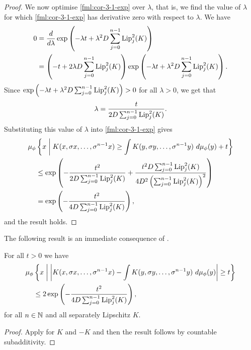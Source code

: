 \begin{corollary}
\begin{proof}
		We now optimise \eqref{fml:cor-3-1-exp} over $\lambda$, that is, we find the value of $\lambda$ for which \eqref{fml:cor-3-1-exp} has derivative zero with respect to $\lambda$. We have
		\begin{align*}
			0 &= \frac{d}{d\lambda} \exp\left(-\lambda t + \lambda^2 D \sum_{j = 0}^{n - 1}{\operatorname{Lip}_j^2(K)}\right) \\
				&= \left(-t + 2\lambda D \sum_{j = 0}^{n - 1}{\operatorname{Lip}_j^2(K)}\right) \exp\left(-\lambda t + \lambda^2 D \sum_{j = 0}^{n - 1}{\operatorname{Lip}_j^2(K)}\right).
		\end{align*}
		Since $\exp\left(-\lambda t + \lambda^2 D \sum_{j = 0}^{n - 1}{\operatorname{Lip}_j^2(K)}\right) > 0$ for all $\lambda > 0$, we get that
		\[
			\lambda = \frac{t}{2D \sum_{j = 0}^{n - 1}{\operatorname{Lip}_j^2(K)}}.
		\]
		Substituting this value of $\lambda$ into \eqref{fml:cor-3-1-exp} gives
		\begin{align*}
			\mu_\phi&\left\{x \midmid K(x, \sigma{x}, \dots, \sigma^{n - 1}{x}) \geq \int{K(y, \sigma{y}, \dots, \sigma^{n - 1}{y})\ d\mu_\phi(y)} + t\right\} \\
			 &\leq \exp\left(-\frac{t^2}{2D \sum_{j = 0}^{n - 1}{\Lip_j^2(K)}} + \frac{t^2 D \sum_{j = 0}^{n - 1}{\Lip_j^2(K)}}{4D^2 \left(\sum_{j = 0}^{n - 1}{\Lip_j^2(K)}\right)^2}\right) \\
			 &= \exp\left(-\frac{t^2}{4D\sum_{j = 0}^{n - 1}{\Lip_j^2(K)}}\right),
		\end{align*}
		and the result holds.
	\end{proof}
\end{corollary}

The following result is an immediate consequence of .

\begin{corollary}\label{cor:cm-3-1-5}
	For all $t > 0$ we have
	\begin{align}\label{fml:cm-4-5}
		\mu_\phi&\left\{x \midmid \left| K(x, \sigma{x}, \dots, \sigma^{n - 1}{x}) - \int{K(y, \sigma{y}, \dots, \sigma^{n - 1}{y})\ d\mu_\phi(y)} \right| \geq t\right\} \nonumber \\
		&\leq 2\exp\left(-\frac{t^2}{4D\sum_{j = 0}^{n - 1}{\Lip_j^2(K)}}\right),
	\end{align}
	for all $n \in \mathbb{N}$ and all separately Lipschitz $K$.
	\begin{proof}
		Apply  for $K$ and $-K$ and then the result follows by countable subadditivity.
	\end{proof}
\end{corollary}

